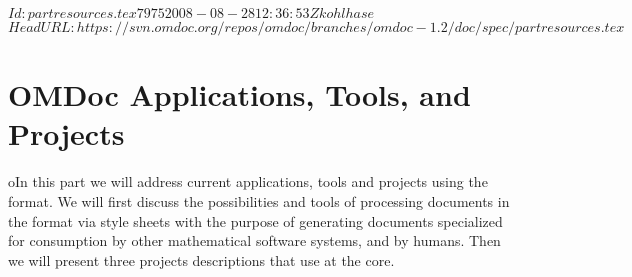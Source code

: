 \svnInfo $Id: partresources.tex 7975 2008-08-28 12:36:53Z kohlhase $
\svnKeyword $HeadURL: https://svn.omdoc.org/repos/omdoc/branches/omdoc-1.2/doc/spec/partresources.tex $

\part{OMDoc Applications, Tools, and Projects}\label{part:applications}
oIn this part we will address current applications, tools and projects using the
{\omdoc} format.  We will first discuss the possibilities and tools of processing
documents in the {\omdoc} format via style sheets with the purpose of generating
documents specialized for consumption by other mathematical software systems, and
by humans. Then we will present three projects descriptions that use {\omdoc} at
the core.

